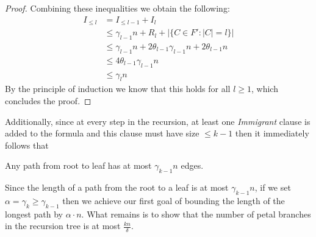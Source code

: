 \begin{proof}
    Combining these inequalities we obtain the following:
    \begin{align*}
        I_{\leq l} &= I_{\leq l - 1} + I_{l} \\
        &\leq \gamma_{l-1}n + R_l + |\{C \in F' : |C| = l\}| \\
        &\leq \gamma_{l-1}n + 2\theta_{l-1}\gamma_{l-1}n + 2 \theta_{l-1}n \\
        &\leq 4\theta_{l-1}\gamma_{l-1}n \\
        &\leq \gamma_{l}n
    \end{align*}
    By the principle of induction we know that this holds for all $l \geq 1$, which concludes the proof.
\end{proof}

Additionally, since at every step in the recursion, at least one \textit{Immigrant} clause is added
to the formula and this clause must have size $\leq k - 1$ then it immediately follows that
\begin{corollary}
    Any path from root to leaf has at most $\gamma_{k-1} n$ edges.
\end{corollary}

Since the length of a path from the root to a leaf is at most $\gamma_{k-1}n$,
if we set $\alpha = \gamma_{k} \geq \gamma_{k-1}$ then we achieve our first goal of bounding the length of the longest
path by $\alpha \cdot n$. What remains is to show that the number of petal branches in the recursion tree
is at most $\frac{kn}{\delta}$.

